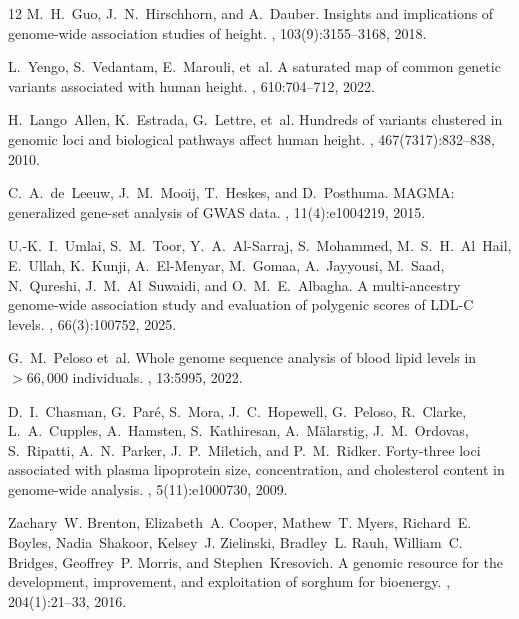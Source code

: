 \documentclass[unnumsec,webpdf,contemporary,large]{oup-authoring-template}%
\theoremstyle{thmstyleone}%
\theoremstyle{thmstyletwo}%
\theoremstyle{thmstylethree}%
\begin{document}
\begin{thebibliography}{12}
M.~H.~Guo, J.~N.~Hirschhorn, and A.~Dauber.
\newblock Insights and implications of genome-wide association studies of height.
, 103(9):3155--3168, 2018.

L.~Yengo, S.~Vedantam, E.~Marouli, et~al.
\newblock A saturated map of common genetic variants associated with human height.
, 610:704--712, 2022.

H.~Lango~Allen, K.~Estrada, G.~Lettre, et~al.
\newblock Hundreds of variants clustered in genomic loci and biological pathways affect human height.
, 467(7317):832--838, 2010.

C.~A.~de~Leeuw, J.~M.~Mooij, T.~Heskes, and D.~Posthuma.
\newblock MAGMA: generalized gene-set analysis of GWAS data.
, 11(4):e1004219, 2015.

U.-K.~I.~Umlai, S.~M.~Toor, Y.~A.~Al-Sarraj, S.~Mohammed, M.~S.~H.~Al~Hail, E.~Ullah, K.~Kunji, A.~El-Menyar, M.~Gomaa, A.~Jayyousi, M.~Saad, N.~Qureshi, J.~M.~Al~Suwaidi, and O.~M.~E.~Albagha.
\newblock A multi-ancestry genome-wide association study and evaluation of polygenic scores of LDL-C levels.
, 66(3):100752, 2025.

G.~M.~Peloso et~al.
\newblock Whole genome sequence analysis of blood lipid levels in $>66{,}000$ individuals.
, 13:5995, 2022.

D.~I.~Chasman, G.~Par\'e, S.~Mora, J.~C.~Hopewell, G.~Peloso, R.~Clarke, L.~A.~Cupples, A.~Hamsten, S.~Kathiresan, A.~M\"alarstig, J.~M.~Ordovas, S.~Ripatti, A.~N.~Parker, J.~P.~Miletich, and P.~M.~Ridker.
\newblock Forty-three loci associated with plasma lipoprotein size, concentration, and cholesterol content in genome-wide analysis.
, 5(11):e1000730, 2009.

Zachary~W. Brenton, Elizabeth~A. Cooper, Mathew~T. Myers, Richard~E. Boyles, Nadia~Shakoor, Kelsey~J. Zielinski, Bradley~L. Rauh, William~C. Bridges, Geoffrey~P. Morris, and Stephen~Kresovich.
\newblock A genomic resource for the development, improvement, and exploitation of sorghum for bioenergy.
, 204(1):21--33, 2016.


\end{thebibliography}
\end{document}
